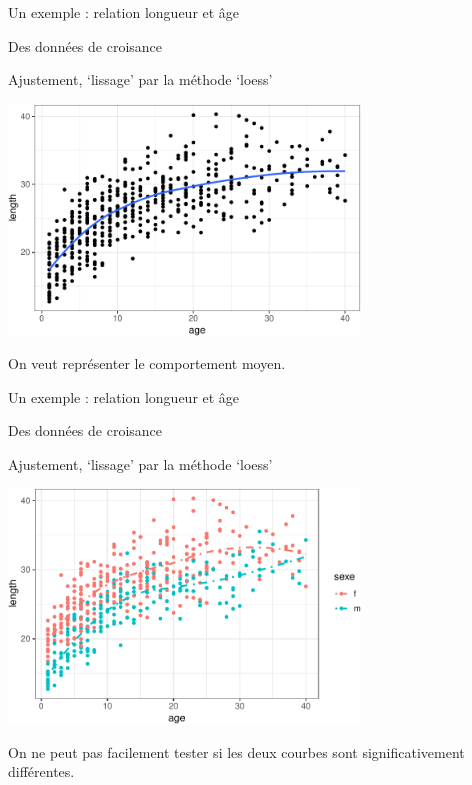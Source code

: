 \documentclass[10pt,ignorenonframetext,]{beamer}
\begin{document}
\begin{frame}{Un exemple : relation longueur et âge}

Des données de croisance

Ajustement, `lissage' par la méthode `loess'

\scriptsize

\begin{center}\includegraphics[width=0.7\textwidth]{figures/unnamed-chunk-2-1} \end{center}

\normalsize

On veut représenter le comportement moyen.

\end{frame}

\begin{frame}{Un exemple : relation longueur et âge}

Des données de croisance

Ajustement, `lissage' par la méthode `loess'

\scriptsize

\begin{center}\includegraphics[width=0.7\textwidth]{figures/unnamed-chunk-3-1} \end{center}

\normalsize

On ne peut pas facilement tester si les deux courbes sont
significativement différentes.

\end{frame}
\end{document}

